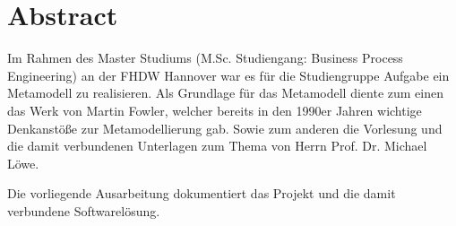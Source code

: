 \section*{Abstract}
Im Rahmen des Master Studiums (M.Sc. Studiengang: Business Process Engineering) an der FHDW Hannover
war es für die Studiengruppe  Aufgabe ein Metamodell zu realisieren. Als Grundlage für das Metamodell diente zum einen das Werk 
  von Martin Fowler, welcher bereits in den 1990er Jahren wichtige Denkanstöße zur Metamodellierung gab. 
Sowie zum anderen die Vorlesung und die damit verbundenen Unterlagen zum Thema  von Herrn Prof. Dr. Michael Löwe. 

Die vorliegende Ausarbeitung dokumentiert das Projekt  und die damit verbundene Softwarelösung.
